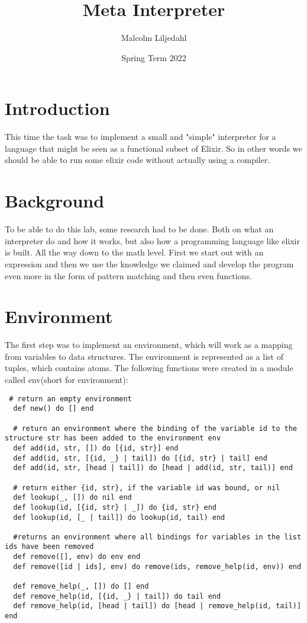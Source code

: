\documentclass[a4paper,11pt]{article}
\begin{document}
\title{
    \textbf{Meta Interpreter}
}
\author{Malcolm Liljedahl}
\date{Spring Term 2022}

\maketitle

\section*{Introduction}

This time the task was to implement a small and "simple" interpreter for a language that might be seen as a functional subset of Elixir. So in other words we should be able to run some elixir code without actually using a compiler.


\section{Background}
To be able to do this lab, some research had to be done. Both on what an interpreter do and how it works, but also how a programming language like elixir is built. All the way down to the math level. First we start out with an expression and then we use the knowledge we claimed and develop the program even more in the form of pattern matching and then even functions.

\section{Environment}
The first step was to implement an environment, which will work as a mapping from variables to data structures. The environment is represented as a list of tuples, which contains atoms. The following functions were created in a module called env(short for environment):

\begin{verbatim}
 # return an empty environment
  def new() do [] end

  # return an environment where the binding of the variable id to the structure str has been added to the environment env
  def add(id, str, []) do [{id, str}] end
  def add(id, str, [{id, _} | tail]) do [{id, str} | tail] end
  def add(id, str, [head | tail]) do [head | add(id, str, tail)] end

  # return either {id, str}, if the variable id was bound, or nil
  def lookup(_, []) do nil end
  def lookup(id, [{id, str} | _]) do {id, str} end
  def lookup(id, [_ | tail]) do lookup(id, tail) end

  #returns an environment where all bindings for variables in the list ids have been removed
  def remove([], env) do env end
  def remove([id | ids], env) do remove(ids, remove_help(id, env)) end

  def remove_help(_, []) do [] end
  def remove_help(id, [{id, _} | tail]) do tail end
  def remove_help(id, [head | tail]) do [head | remove_help(id, tail)] end
  
\end{verbatim}
\end{document}
